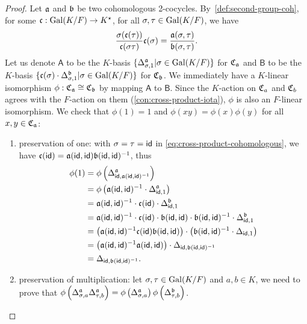 \begin{proof}
  Let $\mathfrak{a}$ and $\mathfrak{b}$ be two cohomologous 2-cocycles. By~\cref{def:second-group-coh}, for some $\mathfrak{c}: \operatorname{Gal}(K/F) \to K^{\star}$, for all $\sigma, \tau\in\operatorname{Gal}(K/F)$, we have
    \begin{equation}
      \label{eq:cross-product-cohomologous}
    \frac{\sigma(\mathfrak{c}(\tau))}{\mathfrak{c}(\sigma\tau)}\mathfrak{c}(\sigma) = \frac{\mathfrak{a}(\sigma, \tau)}{\mathfrak{b}(\sigma, \tau)}.
    \end{equation}
    Let us denote $\mathsf{A}$ to be the $K$-basis $\{\Delta^{\mathfrak{a}}_{\sigma, 1} | \sigma\in\operatorname{Gal}(K/F)\}$ for $\operatorname{\mathfrak{C}}_{\mathfrak{a}}$ and $\mathsf{B}$ to be the $K$-basis $\{\mathfrak{c}(\sigma)\cdot \Delta^{\mathfrak{b}}_{\sigma, 1}|\sigma\in\operatorname{Gal}(K/F)\}$ for $\operatorname{\mathfrak{C}}_{\mathfrak{b}}$. We immediately have a $K$-linear isomorphism $\phi : \operatorname{\mathfrak{C}}_{\mathfrak{a}}\cong \operatorname{\mathfrak{C}}_{\mathfrak{b}}$ by mapping $\mathsf{A}$ to $\mathsf{B}$. Since the $K$-action on $\operatorname{\mathfrak{C}}_{a}$ and $\operatorname{\mathfrak{C}}_{b}$ agrees with the $F$-action on them (\cref{con:cross-product-iota}), $\phi$ is also an $F$-linear isomorphism. We check that $\phi(1) = 1$ and $\phi(xy) = \phi(x)\phi(y)$ for all $x, y \in \operatorname{\mathfrak{C}}_{\mathfrak{a}}$:
    \begin{enumerate}
      \item preservation of one: with $\sigma = \tau =\mathsf{id}$ in \cref{eq:cross-product-cohomologous}, we have $\mathfrak{c}(\mathsf{id}) = \mathfrak{a}(\mathsf{id},\mathsf{id})\mathfrak{b}(\mathsf{id},\mathsf{id})^{-1}$, thus
  \[
    \begin{aligned}
      \phi(1)
      &= \phi\left(\Delta^{\mathfrak{a}}_{\mathsf{id},\mathfrak{a}(\mathsf{id},\mathsf{id})^{-1}}\right)\\
      &= \phi\left(
        \mathfrak{a}(\mathsf{id},\mathsf{id})^{-1}\cdot \Delta^{\mathfrak{a}}_{\mathsf{id}, 1}
        \right) \\
      &= \mathfrak{a}(\mathsf{id},\mathsf{id})^{-1}\cdot \mathfrak{c}(\mathsf{id}) \cdot \Delta^{\mathfrak{b}}_{\mathsf{id}, 1} \\
      &= \mathfrak{a}(\mathsf{id},\mathsf{id})^{-1}\cdot \mathfrak{c}(\mathsf{id})\cdot \mathfrak{b}(\mathsf{id},\mathsf{id}) \cdot \mathfrak{b}(\mathsf{id},\mathsf{id})^{-1}\cdot \Delta^{\mathfrak{b}}_{\mathsf{id}, 1} \\
      &= \left(
        \mathfrak{a}(\mathsf{id},\mathsf{id})^{-1}\mathfrak{c}(\mathsf{id})\mathfrak{b}(\mathsf{id},\mathsf{id})
        \right)\cdot
        \left(
        \mathfrak{b}(\mathsf{id},\mathsf{id})^{-1}\cdot \Delta_{\mathsf{id}, 1}
        \right) \\
      &= \left(\mathfrak{a}(\mathsf{id},\mathsf{id})^{-1}\mathfrak{a}(\mathsf{id},\mathsf{id})\right)\cdot \Delta_{\mathsf{id},\mathfrak{b}(\mathsf{id},\mathsf{id})^{-1}} \\
      &= \Delta_{\mathsf{id},\mathfrak{b}(\mathsf{id},\mathsf{id})^{-1}}.
    \end{aligned}
  \]
      \item preservation of multiplication:
            let $\sigma,\tau\in\operatorname{Gal}(K/F)$ and $a, b \in K$, we need to prove that $\phi\left(\Delta^{\mathfrak{a}}_{\sigma, a}\Delta^{\mathfrak{a}}_{\tau, b}\right) = \phi\left(\Delta^{\mathfrak{a}}_{\sigma, a}\right)\phi\left(\Delta^{\mathfrak{b}}_{\tau, b}\right)$.

\end{enumerate}
\end{proof}
